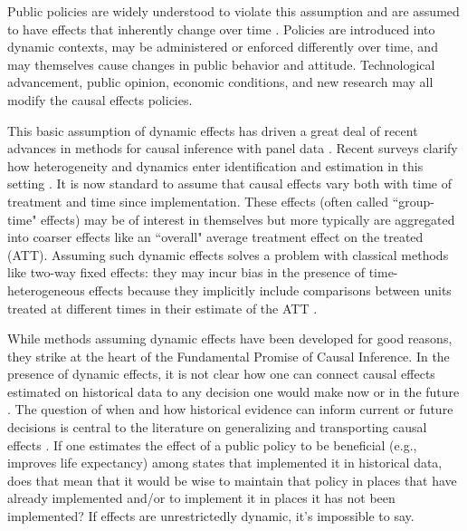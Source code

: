 \documentclass{article}
\begin{document}
Public policies are widely understood to violate this assumption and are assumed to have effects that inherently change over time \citep{lucasjrEconometricPolicyEvaluation1976,ericssonExogeneityCointegrationEconomic1998,estrellaAreDeepParameters1999}. Policies are introduced into dynamic contexts, may be administered or enforced differently over time, and may themselves cause changes in public behavior and attitude. Technological advancement, public opinion, economic conditions, and new research may all modify the causal effects policies. 

This basic assumption of dynamic effects has driven a great deal of recent advances in methods for causal inference with panel data \citep{sunEstimatingDynamicTreatment2021,wangAdvancesDifferenceindifferencesMethods2024a}. Recent surveys clarify how heterogeneity and dynamics enter identification and estimation in this setting \citep{arkhangelskyCausalModelsLongitudinal2024,dechaisemartinTwowayFixedEffects2023}. It is now standard to assume that causal effects vary both with time of treatment and time since implementation. These effects (often called ``group-time" effects) may be of interest in themselves but more typically are aggregated into coarser effects like an ``overall" average treatment effect on the treated (ATT). Assuming such dynamic effects solves a problem with classical methods like two-way fixed effects: they may incur bias in the presence of time-heterogeneous effects because they implicitly include comparisons between units treated at different times in their estimate of the ATT \citep{sunEstimatingDynamicTreatment2021}.

While methods assuming dynamic effects have been developed for good reasons, they strike at the heart of the Fundamental Promise of Causal Inference. In the presence of dynamic effects, it is not clear how one can connect causal effects estimated on historical data to any decision one would make now or in the future \citep{egamiElementsExternalValidity2023,devauxQuantifyingRobustnessExternal2022,khosrowiExtrapolationCausalEffects2019}. The question of when and how historical evidence can inform current or future decisions is central to the literature on generalizing and transporting causal effects \citep{coleGeneralizingEvidenceRandomized2010,tiptonImprovingGeneralizationsExperiments2013,manskiPublicPolicyUncertain2013}. If one estimates the effect of a public policy to be beneficial (e.g., improves life expectancy) among states that implemented it in historical data, does that mean that it would be wise to maintain that policy in places that have already implemented and/or to implement it in places it has not been implemented? If effects are unrestrictedly dynamic, it's impossible to say. 
\end{document}
